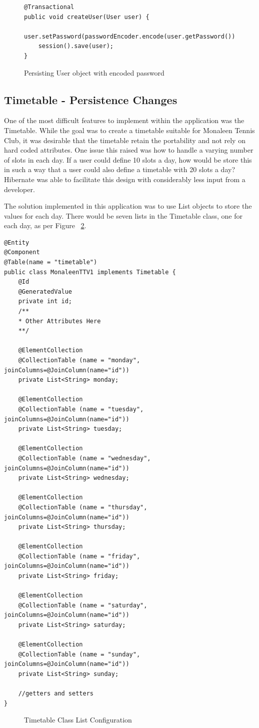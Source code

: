 \begin{figure}[H]
\begin{lstlisting}
@Transactional
public void createUser(User user) {
	user.setPassword(passwordEncoder.encode(user.getPassword()));
	session().save(user);
}
\end{lstlisting}
\caption{Persisting User object with encoded password}
\label{fig:userPersist}
\end{figure}

\subsection{Timetable - Persistence Changes}

One of the most difficult features to implement within the application was the Timetable. While the goal was to create a timetable suitable for Monaleen Tennis Club, it was desirable that the timetable retain the portability and not rely on hard coded attributes. One issue this raised was how to handle a varying number of slots in each day. If a user could define 10 slots a day, how would be store this in such a way that a user could also define a timetable with 20 slots a day? Hibernate was able to facilitate this design with considerably less input from a developer.

The solution implemented in this application was to use List objects to store the values for each day. There would be seven lists in the Timetable class, one for each day, as per Figure ~\ref{fig:timetableConfig}.


\begin{lstlisting}
@Entity
@Component
@Table(name = "timetable")
public class MonaleenTTV1 implements Timetable {
	@Id
	@GeneratedValue
	private int id;
	/**
	* Other Attributes Here
	**/
	
	@ElementCollection
	@CollectionTable (name = "monday", joinColumns=@JoinColumn(name="id"))
	private List<String> monday;
	
	@ElementCollection
	@CollectionTable (name = "tuesday", joinColumns=@JoinColumn(name="id"))
	private List<String> tuesday;
	
	@ElementCollection
	@CollectionTable (name = "wednesday", joinColumns=@JoinColumn(name="id"))
	private List<String> wednesday;
	
	@ElementCollection
	@CollectionTable (name = "thursday", joinColumns=@JoinColumn(name="id"))
	private List<String> thursday;
	
	@ElementCollection
	@CollectionTable (name = "friday", joinColumns=@JoinColumn(name="id"))
	private List<String> friday;
	
	@ElementCollection
	@CollectionTable (name = "saturday", joinColumns=@JoinColumn(name="id"))
	private List<String> saturday;
	
	@ElementCollection
	@CollectionTable (name = "sunday", joinColumns=@JoinColumn(name="id"))
	private List<String> sunday;
	
	//getters and setters
}
\end{lstlisting}
\begin{figure}[H]
\caption{Timetable Class List Configuration}
\label{fig:timetableConfig}
\end{figure}

